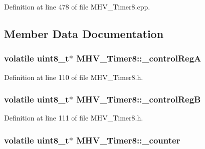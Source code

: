 \-Definition at line 478 of file \-M\-H\-V\-\_\-\-Timer8.\-cpp.



\subsection{\-Member \-Data \-Documentation}
\hypertarget{class_m_h_v___timer8_a2370aea351bfaed055c42b2ecfe6c930}{
\subsubsection[{\-\_\-control\-Reg\-A}]{\setlength{\rightskip}{0pt plus 5cm}volatile uint8\-\_\-t$\ast$ {\bf \-M\-H\-V\-\_\-\-Timer8\-::\-\_\-control\-Reg\-A}}}
\label{class_m_h_v___timer8_a2370aea351bfaed055c42b2ecfe6c930}


\-Definition at line 110 of file \-M\-H\-V\-\_\-\-Timer8.\-h.

\hypertarget{class_m_h_v___timer8_ab713d8f3b71551b6146703d9ecfc5301}{
\subsubsection[{\-\_\-control\-Reg\-B}]{\setlength{\rightskip}{0pt plus 5cm}volatile uint8\-\_\-t$\ast$ {\bf \-M\-H\-V\-\_\-\-Timer8\-::\-\_\-control\-Reg\-B}}}
\label{class_m_h_v___timer8_ab713d8f3b71551b6146703d9ecfc5301}


\-Definition at line 111 of file \-M\-H\-V\-\_\-\-Timer8.\-h.

\hypertarget{class_m_h_v___timer8_ae99499e5828be6ed0c312cd43821a7c3}{
\subsubsection[{\-\_\-counter}]{\setlength{\rightskip}{0pt plus 5cm}volatile uint8\-\_\-t$\ast$ {\bf \-M\-H\-V\-\_\-\-Timer8\-::\-\_\-counter}}}
\label{class_m_h_v___timer8_ae99499e5828be6ed0c312cd43821a7c3}


